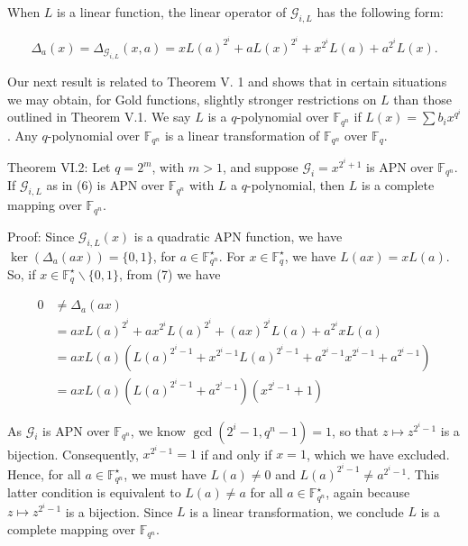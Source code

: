 \documentclass[10pt]{article}
\begin{document}
When $L$ is a linear function, the linear operator of $\mathcal{G}_{i, L}$ has the following form:


\begin{equation*}
\Delta_{a}(x)=\Delta_{\mathcal{G}_{i, L}}(x, a)=x L(a)^{2^{i}}+a L(x)^{2^{i}}+x^{2^{i}} L(a)+a^{2^{i}} L(x) . \tag{7}
\end{equation*}


Our next result is related to Theorem V. 1 and shows that in certain situations we may obtain, for Gold functions, slightly stronger restrictions on $L$ than those outlined in Theorem V.1. We say $L$ is a $q$-polynomial over $\mathbb{F}_{q^{n}}$ if $L(x)=\sum b_{i} x^{q^{i}}$. Any $q$-polynomial over $\mathbb{F}_{q^{n}}$ is a linear transformation of $\mathbb{F}_{q^{n}}$ over $\mathbb{F}_{q}$.

Theorem VI.2: Let $q=2^{m}$, with $m>1$, and suppose $\mathcal{G}_{i}=x^{2^{i}+1}$ is APN over $\mathbb{F}_{q^{n}}$. If $\mathcal{G}_{i, L}$ as in (6) is APN over $\mathbb{F}_{q^{n}}$ with $L$ a $q$-polynomial, then $L$ is a complete mapping over $\mathbb{F}_{q^{n}}$.

Proof: Since $\mathcal{G}_{i, L}(x)$ is a quadratic APN function, we have $\operatorname{ker}\left(\Delta_{a}(a x)\right)=\{0,1\}$, for $a \in \mathbb{F}_{q^{n}}^{\star}$. For $x \in \mathbb{F}_{q}^{\star}$, we have $L(a x)=x L(a)$. So, if $x \in \mathbb{F}_{q}^{\star} \backslash\{0,1\}$, from (7) we have

$$
\begin{aligned}
0 & \neq \Delta_{a}(a x) \\
& =a x L(a)^{2^{i}}+a x^{2^{i}} L(a)^{2^{i}}+(a x)^{2^{i}} L(a)+a^{2^{i}} x L(a) \\
& =a x L(a)\left(L(a)^{2^{i}-1}+x^{2^{i}-1} L(a)^{2^{i}-1}+a^{2^{i}-1} x^{2^{i}-1}+a^{2^{i}-1}\right) \\
& =a x L(a)\left(L(a)^{2^{i}-1}+a^{2^{i}-1}\right)\left(x^{2^{i}-1}+1\right)
\end{aligned}
$$

As $\mathcal{G}_{i}$ is APN over $\mathbb{F}_{q^{n}}$, we know $\operatorname{gcd}\left(2^{i}-1, q^{n}-1\right)=1$, so that $z \mapsto z^{2^{i}-1}$ is a bijection. Consequently, $x^{2^{i}-1}=1$ if and only if $x=1$, which we have excluded. Hence, for all $a \in \mathbb{F}_{q^{n}}^{\star}$, we must have $L(a) \neq 0$ and $L(a)^{2^{i}-1} \neq a^{2^{i}-1}$. This latter condition is equivalent to $L(a) \neq a$ for all $a \in \mathbb{F}_{q^{n}}^{\star}$, again because $z \mapsto z^{2^{i}-1}$ is a bijection. Since $L$ is a linear transformation, we conclude $L$ is a complete mapping over $\mathbb{F}_{q^{n}}$.
\end{document}
